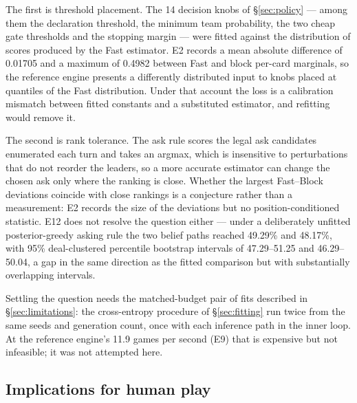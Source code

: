 \documentclass[11pt]{article}
\theoremstyle{definition}
\newcommand{\numSinkhornMean}{0.01705}
\newcommand{\numSinkhornMax}{0.4982}
\newcommand{\numThroughputBlock}{11.9}
\newcommand{\numETwelveFast}{49.29}
\newcommand{\numETwelveFastCI}{47.29--51.25}
\newcommand{\numETwelveBlock}{48.17}
\newcommand{\numETwelveBlockCI}{46.29--50.04}
\newcommand{\numKnobs}{14}
\begin{document}
The first is threshold placement. The \numKnobs{} decision knobs of
\S\ref{sec:policy} --- among them the declaration threshold, the minimum team
probability, the two cheap gate thresholds and the stopping margin --- were
fitted against the distribution of scores produced by the Fast estimator. E2
records a mean absolute difference of \numSinkhornMean{} and a maximum of
\numSinkhornMax{} between Fast and block per-card marginals, so the reference
engine presents a differently distributed input to knobs placed at quantiles of
the Fast distribution. Under that account the loss is a calibration mismatch
between fitted constants and a substituted estimator, and refitting would remove
it.

The second is rank tolerance. The ask rule scores the legal ask candidates
enumerated each turn and takes an argmax, which is insensitive to perturbations
that do not reorder the leaders, so a more accurate estimator can change the
chosen ask only where the ranking is close. Whether the largest Fast--Block
deviations coincide with close rankings is a conjecture rather than a
measurement: E2 records the size of the deviations but no position-conditioned
statistic. E12 does not resolve the question either --- under a deliberately
unfitted posterior-greedy asking rule the two belief paths reached
\numETwelveFast\% and \numETwelveBlock\%, with 95\% deal-clustered percentile
bootstrap intervals of \numETwelveFastCI{} and \numETwelveBlockCI{}, a gap in the
same direction as the fitted comparison but with substantially overlapping
intervals.

Settling the question needs the matched-budget pair of fits described in
\S\ref{sec:limitations}: the cross-entropy procedure of \S\ref{sec:fitting} run
twice from the same seeds and generation count, once with each inference path in
the inner loop. At the reference engine's \numThroughputBlock{} games per second
(E9) that is expensive but not infeasible; it was not attempted here.

\subsection{Implications for human play}
\label{sec:humanplay}
\end{document}

